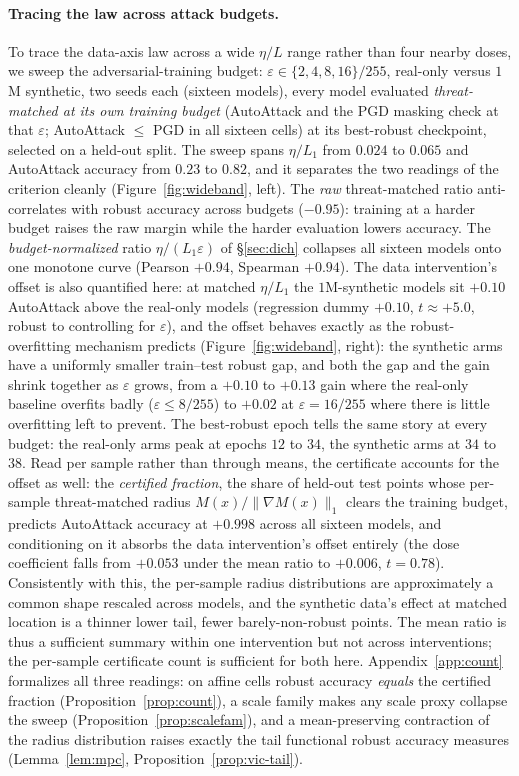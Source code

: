 \documentclass{article}
\theoremstyle{definition}
\begin{document}
\paragraph{Tracing the law across attack budgets.} To trace the data-axis law across a wide $\eta/L$ range rather than four nearby doses, we sweep the adversarial-training budget: $\varepsilon\in\{2,4,8,16\}/255$, real-only versus $1$M synthetic, two seeds each (sixteen models), every model evaluated \emph{threat-matched at its own training budget} (AutoAttack and the PGD masking check at that $\varepsilon$; AutoAttack $\le$ PGD in all sixteen cells) at its best-robust checkpoint, selected on a held-out split. The sweep spans $\eta/L_1$ from $0.024$ to $0.065$ and AutoAttack accuracy from $0.23$ to $0.82$, and it separates the two readings of the criterion cleanly (Figure~\ref{fig:wideband}, left). The \emph{raw} threat-matched ratio anti-correlates with robust accuracy across budgets ($-0.95$): training at a harder budget raises the raw margin while the harder evaluation lowers accuracy. The \emph{budget-normalized} ratio $\eta/(L_1\varepsilon)$ of \S\ref{sec:dich} collapses all sixteen models onto one monotone curve (Pearson $+0.94$, Spearman $+0.94$). The data intervention's offset is also quantified here: at matched $\eta/L_1$ the $1$M-synthetic models sit $+0.10$ AutoAttack above the real-only models (regression dummy $+0.10$, $t\approx+5.0$, robust to controlling for $\varepsilon$), and the offset behaves exactly as the robust-overfitting mechanism predicts (Figure~\ref{fig:wideband}, right): the synthetic arms have a uniformly smaller train--test robust gap, and both the gap and the gain shrink together as $\varepsilon$ grows, from a $+0.10$ to $+0.13$ gain where the real-only baseline overfits badly ($\varepsilon\le8/255$) to $+0.02$ at $\varepsilon=16/255$ where there is little overfitting left to prevent. The best-robust epoch tells the same story at every budget: the real-only arms peak at epochs $12$ to $34$, the synthetic arms at $34$ to $38$. Read per sample rather than through means, the certificate accounts for the offset as well: the \emph{certified fraction}, the share of held-out test points whose per-sample threat-matched radius $M(x)/\|\nabla M(x)\|_1$ clears the training budget, predicts AutoAttack accuracy at $+0.998$ across all sixteen models, and conditioning on it absorbs the data intervention's offset entirely (the dose coefficient falls from $+0.053$ under the mean ratio to $+0.006$, $t=0.78$). Consistently with this, the per-sample radius distributions are approximately a common shape rescaled across models, and the synthetic data's effect at matched location is a thinner lower tail, fewer barely-non-robust points. The mean ratio is thus a sufficient summary within one intervention but not across interventions; the per-sample certificate count is sufficient for both here. Appendix~\ref{app:count} formalizes all three readings: on affine cells robust accuracy \emph{equals} the certified fraction (Proposition~\ref{prop:count}), a scale family makes any scale proxy collapse the sweep (Proposition~\ref{prop:scalefam}), and a mean-preserving contraction of the radius distribution raises exactly the tail functional robust accuracy measures (Lemma~\ref{lem:mpc}, Proposition~\ref{prop:vic-tail}).
\end{document}
